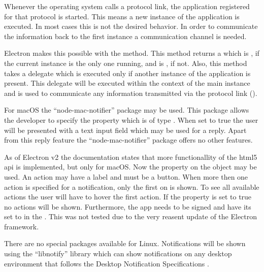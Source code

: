 
Whenever the operating system calls a protocol link, the application registered for that protocol is started. This means a new instance of the application is executed. In most cases this is not the desired behavior. In order to communicate the information back to the first instance a communication channel is needed.

Electron makes this possible with the  method. This method returns a  which is , if the current instance is the only one running, and is , if not. Also, this method takes a delegate which is executed only if another instance of the application is present. This delegate will be executed within the context of the main instance and is used to communicate any information transmitted via the protocol link ().



For macOS the \enquote{node-mac-notifier} package may be used. This package allows the developer to specify the  property which is of type . When set to true the user will be presented with a text input field which may be used for a reply. Apart from this reply feature the \enquote{node-mac-notifier} package offers no other features.

As of Electron v2 the documentation states that more functionallity of the \gls{html}5 \gls{api} is implemented, but only for macOS. Now the  property on the  object may be used. An action may have a label and must be a button. When more then one action is specified for a notification, only the first on is shown. To see all available actions the user will have to hover the first action. If the  property is set to true no actions will be shown. Furthermore, the app needs to be signed and have its  set to  in the . This was not tested due to the very reasent update of the Electron framework.



There are no special packages available for Linux. Notifications will be shown using the \enquote{libnotify} library which can show notifications on any desktop environment that follows the Desktop Notification Specifications \cite{desktopNotificationSpec} \cite{electronNotifications}.
